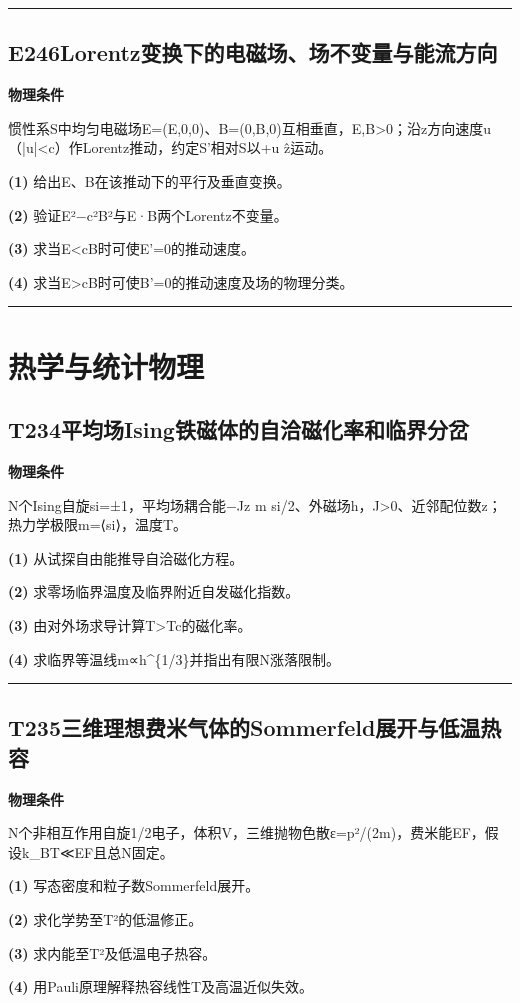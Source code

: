 \documentclass[UTF8,a4paper,11pt,oneside,openany]{ctexbook}
\begin{document}
\par\bigskip\hrule\bigskip
\section*{E246\quad Lorentz变换下的电磁场、场不变量与能流方向}
\textbf{物理条件}\par 惯性系S中均匀电磁场E=(E,0,0)、B=(0,B,0)互相垂直，E,B>0；沿z方向速度u（|u|<c）作Lorentz推动，约定S'相对S以+u ẑ运动。
\par\noindent\textbf{(1)} 给出E、B在该推动下的平行及垂直变换。
\par\noindent\textbf{(2)} 验证E²−c²B²与E·B两个Lorentz不变量。
\par\noindent\textbf{(3)} 求当E<cB时可使E'=0的推动速度。
\par\noindent\textbf{(4)} 求当E>cB时可使B'=0的推动速度及场的物理分类。

\par\bigskip\hrule\bigskip
\chapter{热学与统计物理}
\section*{T234\quad 平均场Ising铁磁体的自洽磁化率和临界分岔}
\textbf{物理条件}\par N个Ising自旋si=±1，平均场耦合能−Jz m si/2、外磁场h，J>0、近邻配位数z；热力学极限m=⟨si⟩，温度T。
\par\noindent\textbf{(1)} 从试探自由能推导自洽磁化方程。
\par\noindent\textbf{(2)} 求零场临界温度及临界附近自发磁化指数。
\par\noindent\textbf{(3)} 由对外场求导计算T>Tc的磁化率。
\par\noindent\textbf{(4)} 求临界等温线m∝h\textasciicircum{}\{1/3\}并指出有限N涨落限制。

\par\bigskip\hrule\bigskip
\section*{T235\quad 三维理想费米气体的Sommerfeld展开与低温热容}
\textbf{物理条件}\par N个非相互作用自旋1/2电子，体积V，三维抛物色散ε=p²/(2m)，费米能EF，假设k\_BT≪EF且总N固定。
\par\noindent\textbf{(1)} 写态密度和粒子数Sommerfeld展开。
\par\noindent\textbf{(2)} 求化学势至T²的低温修正。
\par\noindent\textbf{(3)} 求内能至T²及低温电子热容。
\par\noindent\textbf{(4)} 用Pauli原理解释热容线性T及高温近似失效。
\end{document}
